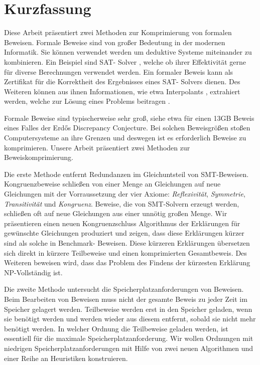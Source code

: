 \chapter*{Kurzfassung}

Diese Arbeit präsentiert zwei Methoden zur Komprimierung von formalen Beweisen.
Formale Beweise sind von gro{\ss}er Bedeutung in der modernen Informatik.
Sie k\"onnen verwendet werden um deduktive Systeme miteinander zu kombinieren. 
Ein Beispiel sind SAT- Solver \cite{Biere2009}, welche ob ihrer Effektivit\"at gerne f\"ur diverse Berechnungen verwendet werden.
Ein formaler Beweis kann als Zertifikat f\"ur die Korrektheit des Ergebnisses eines SAT- Solvers dienen.
Des Weiteren k\"onnen aus ihnen Informationen, wie etwa Interpolants \cite{McMill2005}, extrahiert werden, welche zur L\"osung eines Problems beitragen \cite{Hofferek2013}.

Formale Beweise sind typischerweise sehr gro{\ss}, siehe etwa \cite{Konev2014} f\"ur einen 13GB Beweis eines Falles der Erd\H{o}s Discrepancy Conjecture.
Bei solchen Beweisgr\"o{\ss}en sto{\ss}en Computersysteme an ihre Grenzen und deswegen ist es erforderlich Beweise zu komprimieren.
Unsere Arbeit pr\"asentiert zwei Methoden zur Beweiskomprimierung.

Die erste Methode entfernt Redundanzen im Gleichuntsteil von SMT-Beweisen.
Kongruenzbeweise schlie{\ss}en von einer Menge an Gleichungen auf neue Gleichungen mit der Vorraussetzung der vier Axiome: \emph{Reflexivit\"at}, \emph{Symmetrie}, \emph{Transitivit\"at} und \emph{Kongruenz}.
Beweise, die von SMT-Solvern erzeugt werden, schlie{\ss}en oft auf neue Gleichungen aus einer unn\"otig gro{\ss}en Menge.
Wir pr\"asentieren einen neuen Kongruenzschluss Algorithmus der Erkl\"arungen f\"ur gew\"unschte Gleichungen produziert und zeigen, dass diese Erkl\"arungen k\"urzer sind als solche in Benchmark- Beweisen.
Diese k\"urzeren Erkl\"arungen \"ubersetzen sich direkt in k\"urzere Teilbeweise und einen komprimierten Gesamtbeweis.
Des Weiteren beweisen wird, dass das Problem des Findens der k\"urzesten Erkl\"arung NP-Vollst\"andig ist.

Die zweite Methode untersucht die Speicherplatzanforderungen von Beweisen.
Beim Bearbeiten von Beweisen muss nicht der gesamte Beweis zu jeder Zeit im Speicher gelagert werden.
Teilbeweise werden erst in den Speicher geladen, wenn sie ben\"otigt werden und werden wieder aus diesem entfernt, sobald sie nicht mehr ben\"otigt werden.
In welcher Ordnung die Teilbeweise geladen werden, ist essentiell f\"ur die maximale Speicherplatzanforderung.
Wir wollen Ordnungen mit niedrigen Speicherplatzanforderungen mit Hilfe von zwei neuen Algorithmen und einer Reihe an Heuristiken konstruieren.